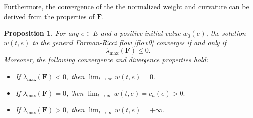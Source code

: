 \documentclass{article}
\newtheorem{proposition}{Proposition}[section]
\begin{document}
Furthermore, the convergence of the the normalized weight and curvature can be derived from the properties of $\textbf{\~{F}}$.
\begin{proposition}\label{the:1.1}For any $e\in E$ and a positive initial value  $w_0(e)$,
the solution $w(t,e)$ to the general Forman-Ricci flow \eqref{flow0} converges if and only if 
\[\lambda_{\max}(\textbf{\~{F}})\leq0.\]
Moreover,  the following convergence and divergence properties hold:
\begin{itemize}
     \item  If $\lambda_{\max}(\textbf{\~{F}})<0,$ then  \(\lim_{t \to \infty} w(t,e) = 0.\)
     \item 
    If $\lambda_{\max}(\textbf{\~{F}})=0$, then \(\lim_{t \to \infty} w(t,e) = c_{n}(e)>0.\) %
    \item  If $\lambda_{\max}(\textbf{\~{F}})>0,$ then  \(\lim_{t \to \infty} w(t,e) = +\infty.\)
\end{itemize}    
\end{proposition} 
\end{document}

